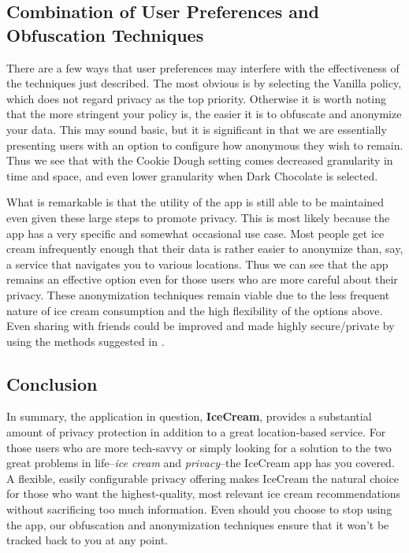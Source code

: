 \documentclass{article}
\begin{document}
\subsection{Combination of User Preferences and Obfuscation Techniques}
There are a few ways that user preferences may interfere with the effectiveness of the techniques just described.
The most obvious is by selecting the Vanilla policy, which does not regard privacy as the top priority. Otherwise it is worth noting that the more stringent your policy is, the easier it is to obfuscate and anonymize your data.
This may sound basic, but it is significant in that we are essentially presenting users with an option to configure how anonymous they wish to remain. Thus we see that with the Cookie Dough setting comes decreased granularity in time and space, and even lower granularity when Dark Chocolate is selected. \par
What is remarkable is that the utility of the app is still able to be maintained even given these large steps to promote privacy. This is most likely because the app has a very specific and somewhat occasional use case. Most people get ice cream infrequently enough that their data is rather easier to anonymize than, say, a service that navigates you to various locations.
Thus we can see that the app remains an effective option even for those users who are more careful about their privacy. These anonymization techniques remain viable due to the less frequent nature of ice cream consumption and the high flexibility of the options above. Even sharing with friends could be improved and made highly secure/private by using the methods suggested in \cite{blumberg2009locational}.

\subsection{Conclusion}
In summary, the application in question, \textbf{IceCream}, provides a substantial amount of privacy protection in addition to a great location-based service. For those users who are more tech-savvy or simply looking for a solution to the two great problems in life--\textit{ice cream} and \textit{privacy}--the IceCream app has you covered. A flexible, easily configurable privacy offering makes IceCream the natural choice for those who want the highest-quality, most relevant ice cream recommendations without sacrificing too much information. Even should you choose to stop using the app, our obfuscation and anonymization techniques ensure that it won't be tracked back to you at any point.

\printbibliography
\end{document}
